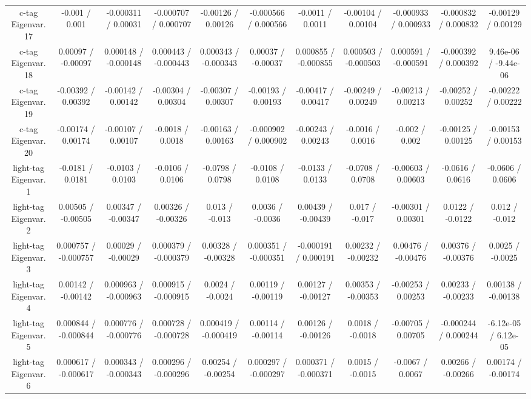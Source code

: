 \begin{table}[htbp]
\begin{center}
\begin{tabular}{|c|c|c|c|c|c|c|c|c|c|c|}
  c-tag Eigenvar. 17 & -0.001 / 0.001 & -0.000311 / 0.00031 & -0.000707 / 0.000707 & -0.00126 / 0.00126 & -0.000566 / 0.000566 & -0.0011 / 0.0011 & -0.00104 / 0.00104 & -0.000933 / 0.000933 & -0.000832 / 0.000832 & -0.00129 / 0.00129 \\ 
  c-tag Eigenvar. 18 & 0.00097 / -0.00097 & 0.000148 / -0.000148 & 0.000443 / -0.000443 & 0.000343 / -0.000343 & 0.00037 / -0.00037 & 0.000855 / -0.000855 & 0.000503 / -0.000503 & 0.000591 / -0.000591 & -0.000392 / 0.000392 & 9.46e-06 / -9.44e-06 \\ 
  c-tag Eigenvar. 19 & -0.00392 / 0.00392 & -0.00142 / 0.00142 & -0.00304 / 0.00304 & -0.00307 / 0.00307 & -0.00193 / 0.00193 & -0.00417 / 0.00417 & -0.00249 / 0.00249 & -0.00213 / 0.00213 & -0.00252 / 0.00252 & -0.00222 / 0.00222 \\ 
  c-tag Eigenvar. 20 & -0.00174 / 0.00174 & -0.00107 / 0.00107 & -0.0018 / 0.0018 & -0.00163 / 0.00163 & -0.000902 / 0.000902 & -0.00243 / 0.00243 & -0.0016 / 0.0016 & -0.002 / 0.002 & -0.00125 / 0.00125 & -0.00153 / 0.00153 \\ 
  light-tag Eigenvar. 1 & -0.0181 / 0.0181 & -0.0103 / 0.0103 & -0.0106 / 0.0106 & -0.0798 / 0.0798 & -0.0108 / 0.0108 & -0.0133 / 0.0133 & -0.0708 / 0.0708 & -0.00603 / 0.00603 & -0.0616 / 0.0616 & -0.0606 / 0.0606 \\ 
  light-tag Eigenvar. 2 & 0.00505 / -0.00505 & 0.00347 / -0.00347 & 0.00326 / -0.00326 & 0.013 / -0.013 & 0.0036 / -0.0036 & 0.00439 / -0.00439 & 0.017 / -0.017 & -0.00301 / 0.00301 & 0.0122 / -0.0122 & 0.012 / -0.012 \\ 
  light-tag Eigenvar. 3 & 0.000757 / -0.000757 & 0.00029 / -0.00029 & 0.000379 / -0.000379 & 0.00328 / -0.00328 & 0.000351 / -0.000351 & -0.000191 / 0.000191 & 0.00232 / -0.00232 & 0.00476 / -0.00476 & 0.00376 / -0.00376 & 0.0025 / -0.0025 \\ 
  light-tag Eigenvar. 4 & 0.00142 / -0.00142 & 0.000963 / -0.000963 & 0.000915 / -0.000915 & 0.0024 / -0.0024 & 0.00119 / -0.00119 & 0.00127 / -0.00127 & 0.00353 / -0.00353 & -0.00253 / 0.00253 & 0.00233 / -0.00233 & 0.00138 / -0.00138 \\ 
  light-tag Eigenvar. 5 & 0.000844 / -0.000844 & 0.000776 / -0.000776 & 0.000728 / -0.000728 & 0.000419 / -0.000419 & 0.00114 / -0.00114 & 0.00126 / -0.00126 & 0.0018 / -0.0018 & -0.00705 / 0.00705 & -0.000244 / 0.000244 & -6.12e-05 / 6.12e-05 \\ 
  light-tag Eigenvar. 6 & 0.000617 / -0.000617 & 0.000343 / -0.000343 & 0.000296 / -0.000296 & 0.00254 / -0.00254 & 0.000297 / -0.000297 & 0.000371 / -0.000371 & 0.0015 / -0.0015 & -0.0067 / 0.0067 & 0.00266 / -0.00266 & 0.00174 / -0.00174 \\ 

\end{tabular}
\end{center}
\end{table}
